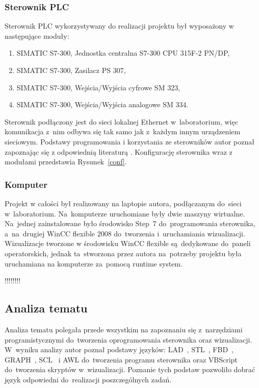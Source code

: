 
\subsubsection{Sterownik PLC}
Sterownik PLC wykorzystywany do realizacji projektu był wyposażony w następujące moduły:
\begin{enumerate}
\item SIMATIC S7-300, Jednostka centralna S7-300 CPU 315F-2 PN/DP,
\item SIMATIC S7-300, Zasilacz PS 307,
\item SIMATIC S7-300, Wejścia/Wyjścia cyfrowe SM 323,
\item SIMATIC S7-300, Wejścia/Wyjścia analogowe SM 334.
\end{enumerate}
\indent
\indent Sterownik podłączony jest do sieci lokalnej Ethernet w~laboratorium, więc komunikacja z~nim odbywa się tak samo jak z~każdym innym urządzeniem sieciowym. Podstawy programowania i korzystania ze sterowników autor poznał zapoznając się z odpowiednią literaturą \cite{plc1,plc2,plc4,plc5,plc6}.
Konfigurację sterownika wraz z modułami przedstawia Rysunek~\ref{conf}.
\subsubsection{Komputer}
Projekt w całości był realizowany na laptopie autora, podłączanym do~sieci w~laboratorium. Na~komputerze uruchomiane były dwie maszyny wirtualne. Na~jednej zainstalowane było środowisko Step~7 do~programowania sterownika, a~na~drugiej WinCC flexible 2008 do~tworzenia i~uruchamiania wizualizacji. Wizualizacje tworzone w środowisku WinCC flexible są~dedykowane do~paneli operatorskich, jednak ta~stworzona przez autora na~potrzeby projektu była uruchamiana na komputerze za~pomocą runtime system.

!!!!!!!!
\subsection{Analiza tematu}
Analiza tematu polegała przede wszystkim na zapoznaniu się z~narzędziami programistycznymi do~tworzenia oprogramowania sterownika oraz wizualizacji.
W~wyniku analizy autor poznał podstawy języków: LAD~\cite{step1,step2,step3}, STL~\cite{step1,step2,step3}, FBD~\cite{step1,step2,step3}, GRAPH~\cite{step3}, SCL~\cite{scl1,scl2,scl3} i AWL do~tworzenia programu sterownika oraz VBScript do~tworzenia skryptów w~wizualizacji.
Poznanie tych podstaw pozwoliło dobrać język odpowiedni do~realizacji poszczególnych zadań.

